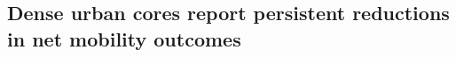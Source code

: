 \documentclass[fleqn,10pt]{wlscirep}
\begin{document}


\subsection*{Dense urban cores report persistent reductions in net mobility outcomes}
\end{document}
